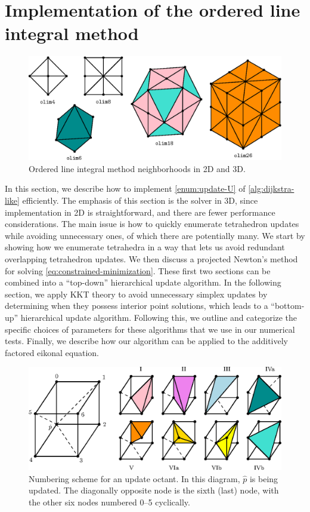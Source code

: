 \documentclass[eikonal.tex]{subfiles}
\begin{document}
  
\section{Implementation of the ordered line integral
  method}\label{sec:implementation}

\begin{figure}[t]
  \centering
  \includegraphics{neighborhoods.eps}
  \caption{Ordered line integral method neighborhoods in 2D and
    3D.}\label{fig:neighborhoods}
\end{figure}

In this section, we describe how to implement \cref{enum:update-U} of
\cref{alg:dijkstra-like} efficiently. The emphasis of this section is
the solver in 3D, since implementation in 2D is straightforward, and
there are fewer performance considerations. The main issue is how to
quickly enumerate tetrahedron updates while avoiding unnecessary ones,
of which there are potentially many. We start by showing how we
enumerate tetrahedra in a way that lets us avoid redundant overlapping
tetrahedron updates. We then discuss a projected Newton's method for
solving \cref{eq:constrained-minimization}. These first two sections
can be combined into a ``top-down'' hierarchical update algorithm. In
the following section, we apply KKT theory to avoid unnecessary
simplex updates by determining when they possess interior point
solutions, which leads to a ``bottom-up'' hierarchical update
algorithm. Following this, we outline and categorize the specific
choices of parameters for these algorithms that we use in our
numerical tests. Finally, we describe how our algorithm can be applied
to the additively factored eikonal equation.

\begin{figure}[t]
  \centering
  \includegraphics{simplex-groups.eps}
  \caption{Numbering scheme for an update octant. In this diagram,
    $\hat{p}$ is being updated. The diagonally opposite node is the
    sixth (last) node, with the other six nodes numbered 0--5
    cyclically.}\label{fig:octant-numbering}
\end{figure}
\end{document}
